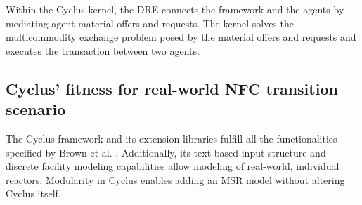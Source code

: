 Within the Cyclus kernel, the \gls{DRE} connects
the framework and the agents by mediating agent material
offers and requests.
The kernel solves the multicommodity exchange problem
posed by the material offers and requests and executes
the transaction between two agents.

\subsection{Cyclus' fitness for real-world \gls{NFC} transition scenario}
The Cyclus framework and its extension libraries fulfill all the functionalities
specified by Brown et al. \cite{brown_identification_2016}.  Additionally,
its text-based input structure and discrete facility modeling capabilities
allow modeling of real-world, individual reactors. 
Modularity in Cyclus enables adding an \gls{MSR} model without altering Cyclus
itself.
